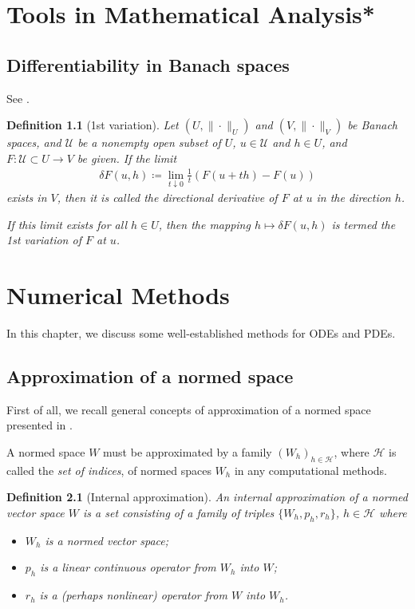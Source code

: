 \documentclass[oneside,11pt]{book}
\numberwithin{equation}{section}
\newtheorem{definition}{Definition}[section]
\begin{document}
\appendix

\chapter{Tools in Mathematical Analysis*}

\section{Differentiability in Banach spaces}
See \cite[Chap. 2, Sect. 2.6]{Troltzsch2010}.

\begin{definition}[1st variation]
    Let $(U,\|\cdot\|_U)$ and $(V,\|\cdot\|_V)$ be Banach spaces, and $\mathcal{U}$ be a nonempty open subset of $U$, $u\in\mathcal{U}$ and $h\in U$, and $F:\mathcal{U}\subset U\to V$ be given. If the limit
    \begin{align*}
        \delta F(u,h)\coloneqq\lim_{t\downarrow 0} \frac{1}{t}\left(F(u + th) - F(u)\right)
    \end{align*}
    exists in $V$, then it is called the \emph{directional derivative} of $F$ at $u$ in the direction $h$.
    
    If this limit exists for all $h\in U$, then the mapping $h\mapsto\delta F(u,h)$ is termed the \emph{1st variation} of $F$ at $u$.
\end{definition}


\chapter{Numerical Methods}

In this chapter, we discuss some well-established methods for ODEs and PDEs.

\section{Approximation of a normed space}
First of all, we recall general concepts of approximation of a normed space presented in \cite[Subsect. I.3.1]{Temam2000}.

A normed space $W$ must be approximated by a family $(W_h)_{h\in\mathcal{H}}$, where $\mathcal{H}$ is called the \textit{set of indices}, of normed spaces $W_h$ in any computational methods.

\begin{definition}[Internal approximation]
    An \emph{internal approximation} of a normed vector space $W$ is a set consisting of a family of triples $\{W_h,p_h,r_h\}$, $h\in\mathcal{H}$ where
    \begin{itemize}
        \item[(i)] $W_h$ is a normed vector space;
        \item[(ii)] $p_h$ is a linear continuous operator from $W_h$ into $W$;
        \item[(iii)] $r_h$ is a (perhaps nonlinear) operator from $W$ into $W_h$.
    \end{itemize}
\end{definition}
\end{document}
